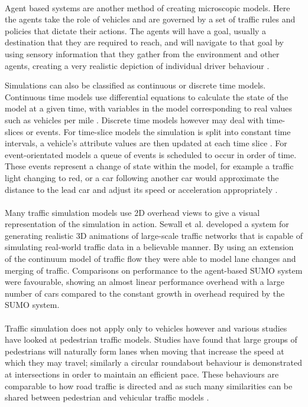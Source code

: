 \paragraph{}
Agent based systems are another method of creating microscopic models. Here the agents take the role of vehicles and are governed by a set of traffic rules and policies that dictate their actions. The agents will have a goal, usually a destination that they are required to reach, and will navigate to that goal by using sensory information that they gather from the environment and other agents, creating a very realistic depiction of individual driver behaviour \cite{948773,4621183}.

\pagebreak
Simulations can also be classified as continuous or discrete time models.
Continuous time models use differential equations to calculate the state of the model at a given time, with variables in the model corresponding to real values such as vehicles per mile \cite{Lighthill1955Kinetic}.
Discrete time models however may deal with time-slices or events. For time-slice models the simulation is split into constant time intervals, a vehicle's attribute values are then updated at each time slice \cite{Schulze:1997:UTS:268437.268764}. For event-orientated models a queue of events is scheduled to occur in order of time. These events represent a change of state within the model, for example a traffic light changing to red, or a car following another car would approximate the distance to the lead car and adjust its speed or acceleration appropriately \cite{Schulze:1997:UTS:268437.268764,algers1997review}.

\paragraph{}
Many traffic simulation models use 2D overhead views to give a visual representation of the simulation in action. Sewall et al. \cite{sewall2010continuum} developed a system for generating realistic 3D animations of large-scale traffic networks that is capable of simulating real-world traffic data in a believable manner. By using an extension of the continuum model of traffic flow they were able to model lane changes and merging of traffic. Comparisons on performance to the agent-based SUMO \cite{SUMO} system were favourable, showing an almost linear performance overhead with a large number of cars compared to the constant growth in overhead required by the SUMO system.

\paragraph{}
Traffic simulation does not apply only to vehicles however and various studies have looked at pedestrian traffic models. Studies have found that large groups of pedestrians will naturally form lanes when moving that increase the speed at which they may travel; similarly a circular roundabout behaviour is demonstrated at intersections in order to maintain an efficient pace. These behaviours are comparable to how road traffic is directed and as such many similarities can be shared between pedestrian and vehicular traffic models \cite{helbing2001self,lovaas1994modeling,helbing2001traffic}.

